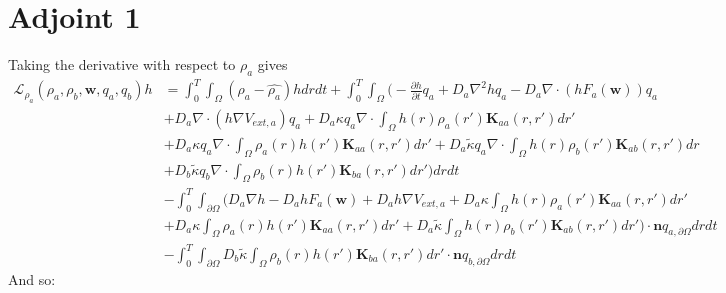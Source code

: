 \documentclass[11pt, a4paper]{article}
\theoremstyle{definition}
\newcommand{\adja}{q_a}
\newcommand{\adjb}{q_b}
\newcommand{\adjaB}{q_{a,\partial \Omega}}
\newcommand{\adjbB}{q_{b,\partial \Omega}}
\newcommand{\ra}{\rho_a}
\newcommand{\rb}{\rho_b}
\newcommand{\w}{\mathbf{w}}
\newcommand{\n}{\mathbf{n}}
\newcommand{\K}{\mathbf{K}}
\begin{document}
	\section{Adjoint 1}
	Taking the derivative with respect to $\ra$ gives
	\begin{align*}
		\mathcal{L}_{\ra}(\ra,\rb, \w, \adja, \adjb) h &= \int_0^T \int_\Omega ( \ra - \widehat{\ra})h dr dt 
       + \int_0^T \int_\Omega \bigg(-\frac{\partial h}{\partial t}\adja + D_a\nabla^2 h \adja - D_a\nabla \cdot(h F_a(\w)) \adja\\
		&  + D_a \nabla \cdot (h \nabla V_{ext,a}) \adja + D_a\kappa\adja \nabla \cdot \int_\Omega  h(r) \ra (r') \K_{aa}(r,r')dr' \\
		&+ D_a\kappa \adja \nabla \cdot \int_\Omega  \ra (r) h (r') \K_{aa}(r,r')dr' + D_a \tilde{\kappa}\adja \nabla \cdot \int_\Omega  h(r) \rb (r') \K_{ab} (r,r')dr  \\
		& + D_b\tilde{\kappa}\adjb \nabla \cdot \int_\Omega \rb(r) h (r')\K_{ba}(r,r')dr'\bigg)  dr dt\\
		&- \int_0^T \int_{\partial \Omega} \bigg( D_a \nabla h - D_a h F_a(\w) + D_a h \nabla V_{ext,a} + D_a\kappa \int_\Omega h(r) \ra (r') \K_{aa}(r,r')dr' \\
		&+ D_a\kappa \int_\Omega \ra(r) h(r') \K_{aa}(r,r')dr'+  D_a\tilde{\kappa} \int_\Omega h(r) \rb (r') \K_{ab}(r,r')dr' \bigg) \cdot \n \adjaB dr dt\\
		&- \int_0^T \int_{\partial \Omega}  D_b\tilde{\kappa} \int_\Omega \rb(r) h(r') \K_{ba}(r,r')dr'  \cdot \n \adjbB dr dt
	\end{align*}
	And so:
\end{document}
